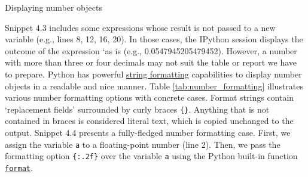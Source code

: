 \documentclass[a4paper,11pt]{book}
\numberwithin{figure}{chapter}
\numberwithin{table}{chapter}
\newcommand{\question}[1]{%
    \begin{tcolorbox}[colback=comp_c!10,colframe=comp_c,sidebyside align=top,width=\linewidth,before skip=1ex]
        #1
    \end{tcolorbox}
    \switchcolumn%
}
\newcommand{\note}[1]{%
    \begin{tcolorbox}[colback=white!0,colframe=white!10,width=\linewidth,before skip=1ex]
        #1
    \end{tcolorbox}
}
\begin{document}
\begin{paracol}{2}
	\question{\raggedright Displaying number objects}
	\note{Snippet 4.3 includes some expressions whose result is not passed to a new variable (e.g., lines 8, 12, 16, 20). In those cases, the IPython session displays the outcome of the expression `as is (e.g., 0.0547945205479452). However, a number with more than three or four decimals may not suit the table or report we have to prepare. Python has powerful \href{https://docs.python.org/3/library/string.html}{string formatting} capabilities to display number objects in a readable and nice manner. Table \ref{tab:number_formatting} illustrates various number formatting options with concrete cases. Format strings contain `replacement fields' surrounded by curly braces \texttt{\{\}}. Anything that is not contained in braces is considered literal text, which is copied unchanged to the output. Snippet 4.4 presents a fully-fledged number formatting case. First, we assign the variable \texttt{a} to a floating-point number (line 2). Then, we pass the formatting option \texttt{\{:.2f\}} over the variable \texttt{a} using the Python built-in function \href{https://docs.python.org/3/library/stdtypes.html\#str.format}{\texttt{format}}.}
\end{paracol}
\clearpage
\end{document}
